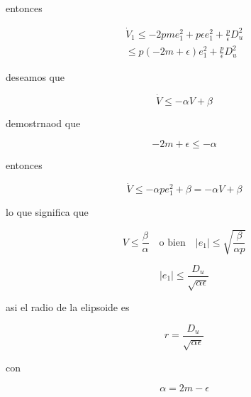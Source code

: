 entonces

\begin{equation*}
    \begin{aligned}
        \dot{V}_1 \leq -2pme_1^2 + p\epsilon e_1^2 + \frac{p}{\epsilon}D_u^2 \\
        \leq p(-2m+\epsilon)e_1^2 + \frac{p}{\epsilon}D_u^2
    \end{aligned}
\end{equation*}

deseamos que 

\begin{equation*}
    \dot{V} \leq -\alpha V + \beta
\end{equation*}

demostrnaod que

\begin{equation*}
    -2m+\epsilon \leq - \alpha
\end{equation*}

entonces 

\begin{equation*}
    \dot{V} \leq - \alpha pe_1^2+\beta= - \alpha V+ \beta
\end{equation*}

lo que significa que 

\begin{equation*}
    V \leq \frac{\beta}{\alpha} \quad \text{o bien} \quad |e_1| \leq \sqrt{\frac{\beta}{\alpha p}}
\end{equation*}

\begin{equation*}
    |e_1| \leq \frac{D_u}{\sqrt{\alpha\epsilon}}
\end{equation*}

asi el radio de la elipsoide es 

\begin{equation*}
    r= \frac{D_u}{\sqrt{\alpha\epsilon}}
\end{equation*}

con 

\begin{equation*}
    \alpha = 2m - \epsilon
\end{equation*}